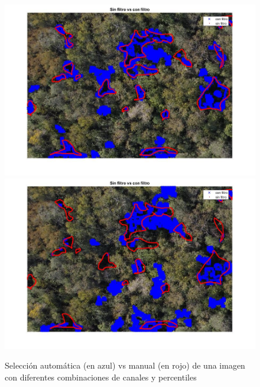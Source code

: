 \begin{figure}
    \includegraphics[width=.3\textwidth]{Imagenes/IIC/p90/BG/210a.jpg}\hfill
    \includegraphics[width=.3\textwidth]{Imagenes/IIC/p90/GR/210a.jpg}\hfill
    
    \caption{Selección automática (en azul) vs manual (en rojo) de una imagen con diferentes combinaciones de canales y percentiles}
\end{figure}\label{dji210}


